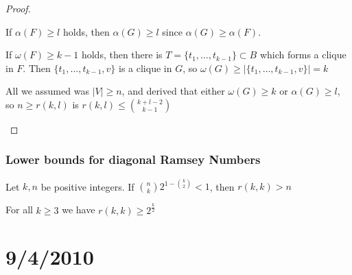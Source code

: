 \documentclass{article}
\begin{document}
\begin{proof}
\begin{itemize}
\begin{itemize}
If $\alpha(F) \ge l$ holds, then $\alpha(G) \ge l$ since $\alpha(G) \ge \alpha(F)$.  

If $\omega(F) \ge k-1$ holds, then there is $T= \{t_1, \ldots, t_{k-1}\} \subset B$ which forms a clique in $F$.   Then $\{t_1, \ldots, t_{k-1}, v\}$ is a clique in $G$, so $\omega(G) \ge |\{t_1, \ldots, t_{k-1}, v\}|=k$
\end{itemize}

All we assumed was $|V| \ge n$, and derived that either $\omega(G) \ge k$ or $\alpha(G) \ge l$, so $n \ge r(k,l)$ is $r(k,l) \le {k+l -2 \choose k-1}$
\end{itemize}
\end{proof}

\subsubsection*{Lower bounds for diagonal Ramsey Numbers}
\begin{thm}
 Let $k, n$ be positive integers.  If ${n \choose k } 2^{1- {k \choose 2}} <1$, then $r(k,k) >n$
\end{thm}

\begin{cor}
 For all $k \ge 3$ we have $r(k,k) \ge 2^{\frac{k}{2}}$
\end{cor}



\section*{9/4/2010}
\end{document}
